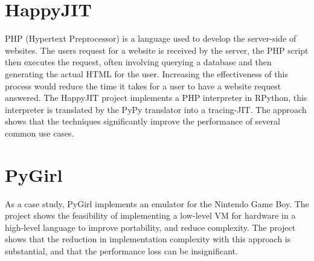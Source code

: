 \section{HappyJIT}

PHP (Hypertext Preprocessor) is a language used to develop the server-side of 
websites. The users request for a website is received by the server, the PHP script
then executes the request, often involving querying a database and then generating 
the actual HTML for the user. Increasing the effectiveness of this process would
reduce the time it takes for a user to have a website request answered. 
The HappyJIT project implements a PHP interpreter in RPython, this interpreter is 
translated by the PyPy translator into a tracing-JIT. The approach shows that 
the techniques significantly improve the performance of several common use cases.
\cite{homescu2011happyjit}

\section{PyGirl}

As a case study, PyGirl implements an emulator for the Nintendo Game Boy. The project 
shows the feasibility of implementing a low-level VM for hardware in a high-level 
language to improve portability, and reduce complexity. The project shows that the
reduction in implementation complexity with this approach is substantial, 
and that the performance loss can be insignificant.
\cite{bruni2009pygirl}


